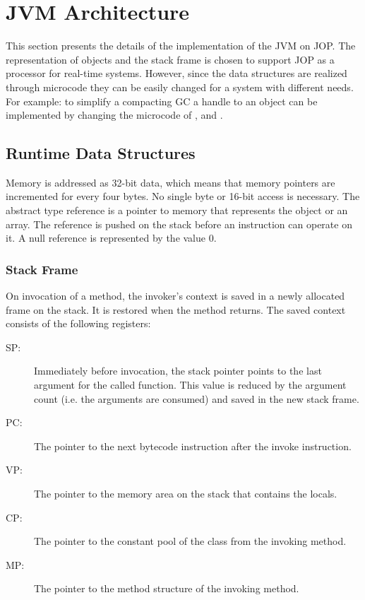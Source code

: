 \section{JVM Architecture}

This section presents the details of the implementation of the JVM on
JOP. The representation of objects and the stack frame is chosen to
support JOP as a processor for real-time systems. However, since the
data structures are realized through microcode they can be easily
changed for a system with different needs. For example: to simplify a
compacting GC a handle to an object can be implemented by changing
the microcode of ,  and .

\subsection{Runtime Data Structures}

Memory is addressed as 32-bit data, which means that memory pointers
are incremented for every four bytes. No single byte or 16-bit
access is necessary. The abstract type reference is a pointer to
memory that represents the object or an array. The reference is
pushed on the stack before an instruction can operate on it. A null
reference is represented by the value 0.

\subsubsection{Stack Frame}

On invocation of a method, the invoker's context is saved in a newly
allocated frame on the stack. It is restored when the method returns.
The saved context consists of the following registers:

\begin{description}

\item[SP:] Immediately before invocation, the stack pointer
    points to the last argument for the called function. This
    value is reduced by the argument count (i.e. the arguments
    are consumed) and saved in the new stack frame.

\item[PC:] The pointer to the next bytecode instruction after the invoke
instruction.

\item[VP:] The pointer to the memory area on the stack that contains
the locals.

\item[CP:] The pointer to the constant pool of the class from the invoking
method.

\item[MP:] The pointer to the method structure of the invoking method.

\end{description}

